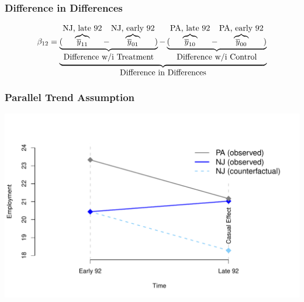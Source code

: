 \documentclass[aspectratio=169]{beamer}
\theoremstyle{principle}
\begin{document}
\begin{frame}
\frametitle{Difference in Differences}

\huge
\begin{align*}
\beta_{12} = \underbrace{\underbrace{(\overbrace{\overline{y}_{11}}^{\mbox{\normalsize NJ, late 92}} - \overbrace{\overline{y}_{01}}^{\mbox{\normalsize NJ, early 92}})}_{\mbox{\normalsize Difference w/i Treatment}} - \underbrace{(\overbrace{\overline{y}_{10}}^{\mbox{\normalsize PA, late 92}} - \overbrace{\overline{y}_{00}}^{\mbox{\normalsize PA, early 92}})}_{\mbox{\normalsize Difference w/i Control}}}_{\mbox{Difference in Differences}}
\end{align*}

\end{frame}

\begin{frame}
\frametitle{Parallel Trend Assumption}

\begin{center}
\includegraphics[scale=0.65]{common_slopes.pdf}
\end{center}

\end{frame}
\end{document}

